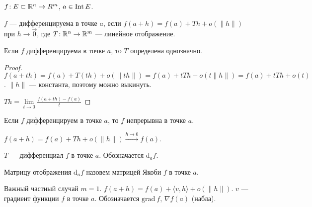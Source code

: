 \begin{definition}
    $f\!: E \subset \mathbb{R}^n \to R^m$,  $a \in \operatorname{Int} E$.

     $f$ --- дифференцируема в точке  $a$, если  $f(a+h) = f(a) + Th + o(\|h\|)$ при  $h \to \overrightarrow{0}$, где  $T\!: \mathbb{R}^n \to \mathbb{R}^m$ --- линейное отображение.
\end{definition}
\begin{remark}
    Если $f$ дифференцируема в точке  $a$, то  $T$ определена однозначно. 
\end{remark}
\begin{proof}
    $f(a+th) = f(a) + T(th) + o(\|th\|) = f(a) + tTh + o(t\|h\|) = f(a) + tTh + o(t)$. $\|h\|$ --- константа, поэтому можно выкинуть.

     $Th = \lim\limits_{t \to 0} \frac{f(a+th) - f(a)}{t}$
\end{proof}
\begin{remark}
    Если $f$ дифференцируем в точке  $a$, то  $f$ непрерывна в точке  $a$.

     $f(a+h) = f(a) + Th + o(\|h\|) \xrightarrow{h \to 0} f(a)$.
\end{remark}
\begin{definition}
    $T$ --- дифференциал $f$ в точке  $a$. Обозначается  $\mathrm{d}_af$. 
\end{definition}
\begin{definition}
    Матрицу отображения $\mathrm{d}_af$ назовем матрицей Якоби  $f$ в точке  $a$.
\end{definition}

Важный частный случай $m = 1$.  $f(a+h) = f(a) + \langle v, h \rangle + o(\| h\|)$. $v$ --- градиент функции  $f$ в точке  $a$. Обозначается  $\text{grad}\ f$,  $\nabla f(a)$ (набла).

